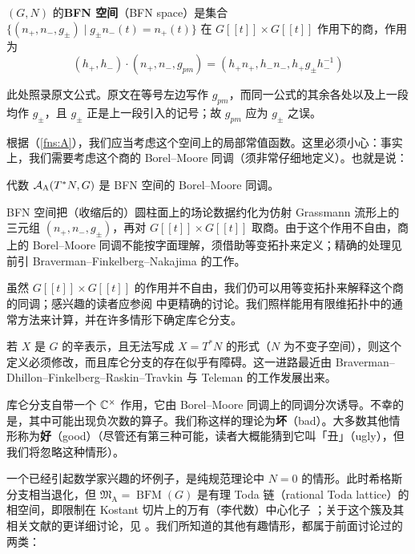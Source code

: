 \begin{definition}
    $(G,N)$ 的{\bf BFN 空间}（BFN space）是集合 $\{(n_+,n_-,g_{\pm}) \mid g_{\pm} n_{-}(t)=n_+(t)\}$ 在 $G[[t]]\times G[[t]]$ 作用下的商，作用为 \[(h_+,h_-)\cdot (n_+,n_-,g_{pm})=(h_+n_+,h_-n_-,h_+g_{\pm}h_-^{-1}) \]
\end{definition}
\begin{yizhu}[下标笔误]
此处照录原文公式。原文在等号左边写作 $g_{pm}$，而同一公式的其余各处以及上一段均作 $g_{\pm}$，且 $g_{\pm}$ 正是上一段引入的记号；故 $g_{pm}$ 应为 $g_{\pm}$ 之误。
\end{yizhu}
根据（\ref{fns:A}），我们应当考虑这个空间上的局部常值函数。这里必须小心：事实上，我们需要考虑这个商的 Borel--Moore 同调（须非常仔细地定义）。也就是说：
\begin{definition}\label{def:Coulomb}
    代数 $\mathcal{A}_{\operatorname{A}}(T^*N,G)$ 是 BFN 空间的 Borel--Moore 同调。
\end{definition}
\begin{yizhu}[BFN 空间]
BFN 空间把（收缩后的）圆柱面上的场论数据约化为仿射 Grassmann 流形上的三元组 $(n_+,n_-,g_{\pm})$，再对 $G[[t]]\times G[[t]]$ 取商。由于这个作用不自由，商上的 Borel--Moore 同调不能按字面理解，须借助等变拓扑来定义；精确的处理见前引 Braverman--Finkelberg--Nakajima 的工作。
\end{yizhu}
虽然 $G[[t]]\times G[[t]]$ 的作用并不自由，我们仍可以用等变拓扑来解释这个商的同调；感兴趣的读者应参阅 \cite{BFN} 中更精确的讨论。我们照样能用有限维拓扑中的通常方法来计算，并在许多情形下确定库仑分支。

若 $X$ 是 $G$ 的辛表示，且无法写成 $X=T^*N$ 的形式（$N$ 为不变子空间），则这个定义必须修改，而且库仑分支的存在似乎有障碍。这一进路最近由 Braverman--Dhillon--Finkelberg--Raskin--Travkin \cite{bravermanCoulombBranches2022} 与 Teleman \cite{telemanCoulombBranches2022} 的工作发展出来。

库仑分支自带一个 $\mathbb{C}^{\times}$ 作用，它由 Borel--Moore 同调上的同调分次诱导。不幸的是，其中可能出现负次数的算子。我们称这样的理论为{\bf 坏}（bad）。大多数其他情形称为{\bf 好}（good）（尽管还有第三种可能，读者大概能猜到它叫「丑」（ugly），但我们将忽略这种情形）。

一个已经引起数学家兴趣的坏例子，是纯规范理论中 $N=0$ 的情形。此时希格斯分支相当退化，但 $\mathfrak{M}_{\operatorname{A}}=\operatorname{BFM}(G)$ 是有理 Toda 链（rational Toda lattice）的相空间，即限制在 Kostant 切片上的万有（李代数）中心化子 \cite{bezrukavnikovEquivariantHomology2005}；关于这个簇及其相关文献的更详细讨论，见 \cite[\S 5.1]{telemanGaugeTheory2014}。我们所知道的其他有趣情形，都属于前面讨论过的两类：

